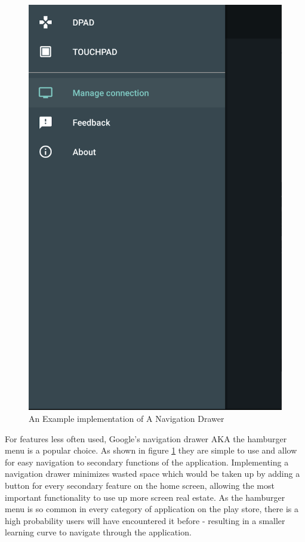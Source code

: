 \begin{figure}
\begin{center}
\includegraphics[scale = 0.4] {design/hme.png}
\end{center}
\caption{An Example implementation of A Navigation Drawer}
\label{hme}
\end{figure}




For features less often used, Google's navigation drawer AKA the hamburger menu is a popular choice. As shown in figure \ref{hme} they are simple to use and allow for easy navigation to secondary functions of the application. Implementing a navigation drawer minimizes wasted space which would be taken up by adding a button for every secondary feature on the home screen, allowing the most important functionality to use up more screen real estate. As the hamburger menu is so common in every category of application on the play store, there is a high probability users will have encountered it before - resulting in a smaller learning curve to navigate through the application.



